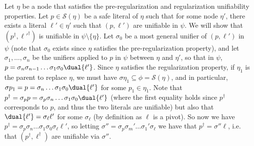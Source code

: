 Let $\eta$ be a node that satisfies the pre-regularization and regularization unifiability properties.
Let $p\in \mathcal{S}(\eta)$ be a safe literal of $\eta$ such that for some node $\eta'$, there exists a literal $\ell' \in \eta'$ such that $(p,\ell')$ are unifiable in $\psi$. We will show that $(p^\dagger,\ell'^\dagger)$ is unifiable in $\psi\setminus\{\eta\}$. 
Let $\sigma_0$ be a most general unifier of $(p,\ell')$ in $\psi$ (note that $\sigma_0$ exists since $\eta$ satisfies the pre-regularization property), and let $\sigma_1,\ldots,\sigma_n$ be the unifiers applied to $p$ in $\psi$ between $\eta$ and $\eta'$, so that in $\psi$, $p=\sigma_n\sigma_{n-1}\ldots\sigma_1\sigma_0\dual{\ell'}$. Since $\eta$ satisfies the regularization property, if $\eta_1$ is the parent to replace $\eta$, we must have $\sigma\eta_1\subseteq \phi = \mathcal{S}(\eta)$, and in particular, $\sigma p_1 = p = \sigma_n\ldots\sigma_1\sigma_0\dual{\ell'}$ for some $p_1\in \eta_1$. 
Note that $p^\dagger = \sigma_p p = \sigma_p\sigma_n\ldots\sigma_1\sigma_0\dual{\ell'}$ (where the first equality holds since $p^\dagger$ corresponds to $p$, and thus the two literals are unifiable) but also that $\dual{\ell'} = \sigma_\ell\ell'$ for some $\sigma_\ell$ (by definition as $\ell$ is a pivot). So now we have $p^\dagger =  \sigma_p\sigma_n\ldots\sigma_1\sigma_0\sigma_\ell\ell'$, so letting $\sigma''=\sigma_p\sigma_m'\ldots\sigma_1'\sigma_\ell$ we have that $p^\dagger = \sigma'' \ell$, i.e. that $(p^\dagger,\ell^\dagger)$ are unifiable via $\sigma''$.

